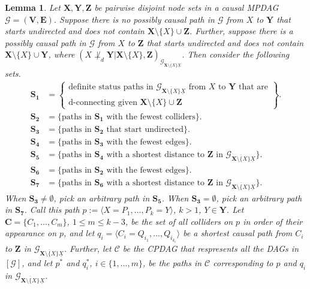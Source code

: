\documentclass[11pt]{article}
\newtheorem{lemma}[theorem]{Lemma}
\newcommand{\mb}[1]{\mathbf{#1}}
\newcommand{\dsepp}{\perp_{d}}
\newcommand{\g}[1][G]{\mathcal{#1}}
\begin{document}

\begin{lemma}
\label{lem:collider-paths}
    Let $\mb{X,Y,Z}$ be pairwise disjoint node sets in a causal MPDAG $\g = (\mb{V,E})$. Suppose there is no possibly causal path in $\g$ from $X$ to $\mb{Y}$ that starts undirected and does not contain $\mb{X} \setminus \{X\} \cup \mb{Z}$. Further, suppose there is a possibly causal path in $\g$ from $X$ to $\mb{Z}$ that starts undirected and does not contain $\mb{X} \setminus \{X\} \cup \mb{Y}$, where $(X \not \dsepp \mb{Y} | \mb{X} \setminus \{X\}, \mb{Z})_{\g_{\overline{\mb{X} \setminus \{X\}} \underline{X}}}$. Then consider the following sets.
    \begin{align*}
        \mb{S_1} &= \left\{\begin{array}{ll}
                                \text{definite status paths in $\g_{\overline{\mb{X} \setminus \{X\}} \underline{X}}$ from $X$ to $\mb{Y}$ that are} \\
                                \text{d-connecting given $\mb{X} \setminus \{X\} \cup \mb{Z}$}
                           \end{array}\right\}.\\
        \mb{S_2} &= \{ \text{paths in $\mb{S_1}$ with the fewest colliders} \}.\\[.4cm]
        \mb{S_3} &= \{ \text{paths in } \mb{S_2} \text{ that start undirected}\}.\\
        \mb{S_4} &= \{ \text{paths in $\mb{S_3}$ with the fewest edges} \}.\\
        \mb{S_5} &= \{ \text{paths in $\mb{S_4}$ with a shortest distance to $\mb{Z}$ in $\g_{\overline{\mb{X} \setminus \{X\}} \underline{X}}$} \}.\\[.4cm]
        \mb{S_6} &= \{ \text{paths in $\mb{S_2}$ with the fewest edges} \}.\\
        \mb{S_7} &= \{ \text{paths in $\mb{S_6}$ with a shortest distance to $\mb{Z}$ in $\g_{\overline{\mb{X} \setminus \{X\}} \underline{X}}$} \}.
    \end{align*}
    When $\mb{S_3} \neq \emptyset$, pick an arbitrary path in $\mb{S_5}$. When $\mb{S_3} = \emptyset$, pick an arbitrary path in $\mb{S_7}$. Call this path $p := \langle X = P_1, \dots, P_k = Y \rangle$, $k > 1$, $Y \in \mb{Y}$. Let $\mb{C} = \{C_1, \dots, C_m \}$, $1 \le m \le k-3$, be the set of all colliders on $p$ in order of their appearance on $p$, and let $q_i = \langle C_i = Q_{i_1}, \dots, Q_{i_{k_i}} \rangle$ be a shortest causal path from $C_i$ to $\mb{Z}$ in $\g_{\overline{\mb{X} \setminus \{X\}} \underline{X}}$. Further, let $\g[C]$ be the CPDAG that respresents all the DAGs in $[\g]$, and let $p^*$ and $q_i^*$, $i \in \{1, \dots, m \}$, be the paths in $\g[C]$ corresponding to $p$ and $q_i$ in $\g_{\overline{\mb{X} \setminus \{X\}} \underline{X}}$.


\end{lemma}
\end{document}
